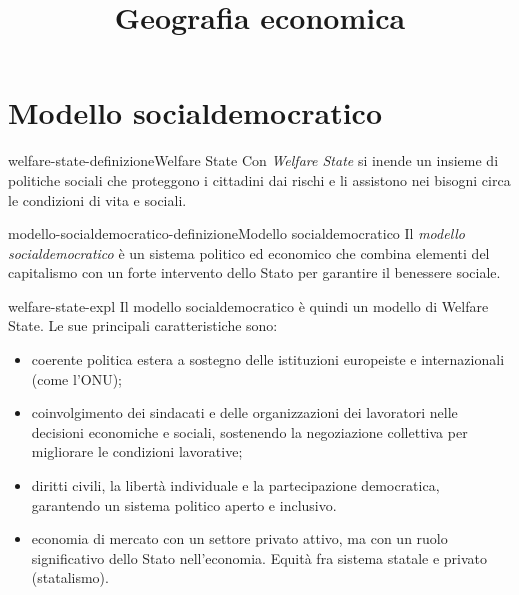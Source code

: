 \documentclass[preview]{standalone}
\begin{document}
\title{Geografia economica}
\genpage

\section{Modello socialdemocratico}

\begin{snippetdefinition}{welfare-state-definizione}{Welfare State}
    Con \textit{Welfare State} si inende un insieme di politiche sociali
    che proteggono i cittadini dai rischi e li assistono nei bisogni circa le condizioni di vita e sociali.
\end{snippetdefinition}

\begin{snippetdefinition}{modello-socialdemocratico-definizione}{Modello socialdemocratico}
    Il \textit{modello socialdemocratico} è un sistema politico ed economico che combina elementi del capitalismo con un forte intervento dello Stato per garantire il benessere sociale.
\end{snippetdefinition}

\begin{snippet}{welfare-state-expl}
    Il modello socialdemocratico è quindi un modello di Welfare State.
    Le sue principali caratteristiche sono:
    \begin{itemize}
        \item coerente politica estera a sostegno delle istituzioni europeiste e internazionali (come l'ONU);
        \item coinvolgimento dei sindacati e delle organizzazioni dei lavoratori nelle decisioni economiche e sociali, sostenendo la negoziazione collettiva per migliorare le condizioni lavorative;
        \item diritti civili, la libertà individuale e la partecipazione democratica, garantendo un sistema politico aperto e inclusivo.
        \item economia di mercato con un settore privato attivo, ma con un ruolo significativo dello Stato nell'economia.
            Equità fra sistema statale e privato (statalismo).
    \end{itemize}
\end{snippet}
\end{document}
